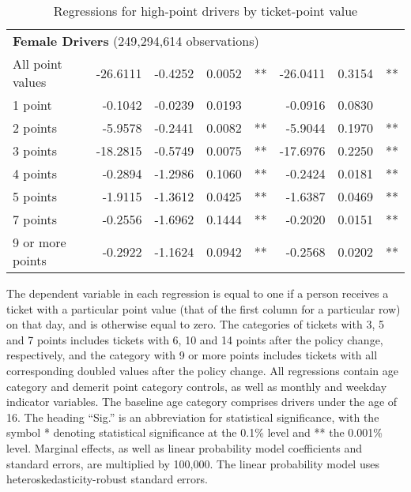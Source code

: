 \begin{table}
\begin{tabular}{l r r r l r r l}
\hline 

\multicolumn{7}{l}{\textbf{Female Drivers} (249,294,614 observations)} \\ 

All point values                &  -26.6111       &  -0.4252        &  0.0052       &   **       &  -26.0411        &  0.3154       &   **       \\ 
1 point                         &  -0.1042       &  -0.0239        &  0.0193       &            &  -0.0916        &  0.0830       &            \\ 
2 points                        &  -5.9578       &  -0.2441        &  0.0082       &   **       &  -5.9044        &  0.1970       &   **       \\ 
3 points                        &  -18.2815       &  -0.5749        &  0.0075       &   **       &  -17.6976        &  0.2250       &   **       \\ 
4 points                        &  -0.2894       &  -1.2986        &  0.1060       &   **       &  -0.2424        &  0.0181       &   **       \\ 
5 points                        &  -1.9115       &  -1.3612        &  0.0425       &   **       &  -1.6387        &  0.0469       &   **       \\ 
7 points                        &  -0.2556       &  -1.6962        &  0.1444       &   **       &  -0.2020        &  0.0151       &   **       \\ 
9 or more points                &  -0.2922       &  -1.1624        &  0.0942       &   **       &  -0.2568        &  0.0202       &   **       \\ 

\hline 

\end{tabular} 
\caption{Regressions for high-point drivers by ticket-point value} 
%
The dependent variable in each regression 
is equal to one if a person receives a ticket with a particular point value 
(that of the first column for a particular row) on that day, 
and is otherwise equal to zero.
%
The categories of tickets with 3, 5 and 7 points includes tickets  
with 6, 10 and 14 points after the policy change, respectively,  
and the category with 9 or more points includes tickets  
with all corresponding doubled values after the policy change. 
All regressions contain age category and demerit point category controls, 
as well as monthly and weekday indicator variables. 
The baseline age category comprises drivers under the age of 16. 
The heading ``Sig.'' is an abbreviation for statistical significance, with 
the symbol * denoting statistical significance at the 0.1\% level 
and ** the 0.001\% level. 
% 
Marginal effects, as well as linear probability model coefficients and standard errors, are multiplied by 100,000. 
The linear probability model uses heteroskedasticity-robust standard errors. 
% 
\label{tab:seas_Logit_vs_LPMx100K_high_pt_regs_by_points} 
\end{table} 
 
